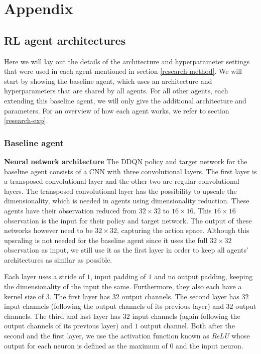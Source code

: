 \chapter{Appendix}\label{appendix}
\section{RL agent architectures}\label{appendix-agents}
Here we will lay out the details of the architecture and hyperparameter settings that were used in each agent mentioned in section \ref{research-method}. We will start by showing the baseline agent, which uses an architecture and hyperparameters that are shared by all agents. For all other agents, each extending this baseline agent, we will only give the additional architecture and parameters. For an overview of how each agent works, we refer to section \ref{research-exp}.


\subsection{Baseline agent}\label{appendix-baseline}
\textbf{Neural network architecture}\newline
\noindent The DDQN policy and target network for the baseline agent consists of a CNN with three convolutional layers. The first layer is a transposed convolutional layer \cite{transpose} and the other two are regular convolutional layers. The transposed convolutional layer has the possibility to upscale the dimensionality, which is needed in agents using dimensionality reduction. These agents have their observation reduced from $32 \times 32$ to $16 \times 16$. This $16 \times 16$ observation is the input for their policy and target network. The output of these networks however need to be $32 \times 32$, capturing the action space. Although this upscaling is not needed for the baseline agent since it uses the full $32 \times 32$ observation as input, we still use it as the first layer in order to keep all agents' architectures as similar as possible.

Each layer uses a stride of $1$, input padding of $1$ and no output padding, keeping the dimensionality of the input the same. Furthermore, they also each have a kernel size of $3$. The first layer has $32$ output channels. The second layer has $32$ input channels (following the output channels of its previous layer) and $32$ output channels. The third and last layer has $32$ input channels (again following the output channels of its previous layer) and $1$ output channel. Both after the second and the first layer, we use the activation function known as \emph{ReLU} \cite{relu} whose output for each neuron is defined as the maximum of $0$ and the input neuron. \newline

